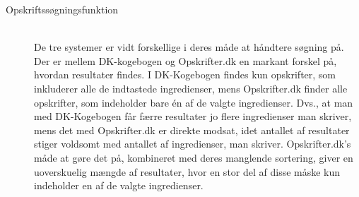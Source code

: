 \begin{description}
\item[Opskriftssøgningsfunktion] \hfill \\
De tre systemer er vidt forskellige i deres måde at håndtere søgning på. Der er mellem DK-kogebogen og Opskrifter.dk en markant forskel på, hvordan resultater findes. I DK-Kogebogen findes kun opskrifter, som inkluderer alle de indtastede ingredienser, mens Opskrifter.dk finder alle opskrifter, som indeholder bare én af de valgte ingredienser. Dvs., at man med DK-Kogebogen får færre resultater jo flere ingredienser man skriver, mens det med Opskrifter.dk er direkte modsat, idet antallet af resultater stiger voldsomt med antallet af ingredienser, man skriver. Opskrifter.dk’s måde at gøre det på, kombineret med deres manglende sortering, giver en uoverskuelig mængde af resultater, hvor en stor del af disse måske kun indeholder en af de valgte ingredienser.
\end{description}




